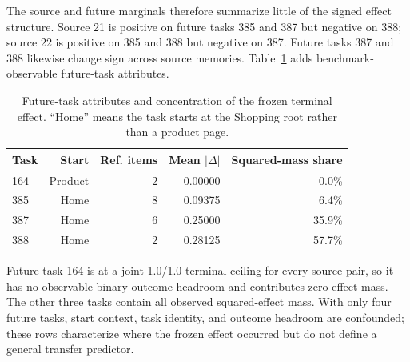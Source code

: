 The source and future marginals therefore summarize little of the signed effect structure. Source 21 is positive on future tasks 385 and 387 but negative on 388; source 22 is positive on 385 and 388 but negative on 387. Future tasks 387 and 388 likewise change sign across source memories. Table~\ref{tab:future-task-heterogeneity} adds benchmark-observable future-task attributes.
\begin{table}[h]
\centering
\small
\caption{Future-task attributes and concentration of the frozen terminal effect. ``Home'' means the task starts at the Shopping root rather than a product page.}
\label{tab:future-task-heterogeneity}
\begin{tabular}{lrrrr}
\toprule
Task & Start & Ref. items & Mean $|\Delta|$ & Squared-mass share \\
\midrule
164 & Product & 2 & 0.00000 & 0.0\% \\
385 & Home & 8 & 0.09375 & 6.4\% \\
387 & Home & 6 & 0.25000 & 35.9\% \\
388 & Home & 2 & 0.28125 & 57.7\% \\
\bottomrule
\end{tabular}
\end{table}
Future task 164 is at a joint 1.0/1.0 terminal ceiling for every source pair, so it has no observable binary-outcome headroom and contributes zero effect mass. The other three tasks contain all observed squared-effect mass. With only four future tasks, start context, task identity, and outcome headroom are confounded; these rows characterize where the frozen effect occurred but do not define a general transfer predictor.

